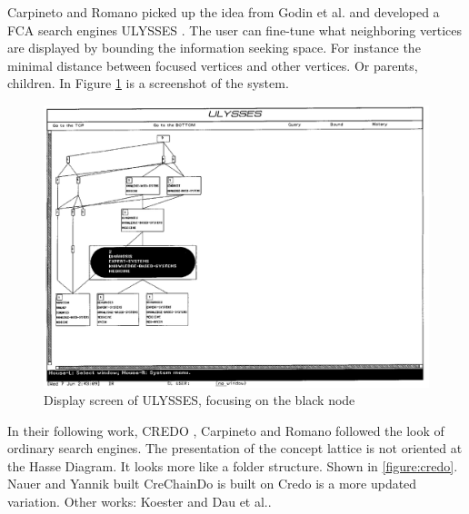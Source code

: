 \documentclass[11pt]{report}
\begin{document}
Carpineto and Romano picked up the idea from Godin et al. and developed a FCA search engines ULYSSES \cite{Carpineto1995,Carpineto1996}. The user can fine-tune what neighboring vertices are displayed by bounding the information seeking space. For instance the minimal distance between focused vertices and other vertices. Or parents, children. In Figure \ref{figure:ulysses} is a screenshot of the system. \\

\begin{figure}[h]
	\centering
	\includegraphics[width=\linewidth]{images/ulysses}
\caption{Display screen of ULYSSES, focusing on the black node \cite{Carpineto1996} }
\label{figure:ulysses}
\end{figure}

In their following work, CREDO \cite{Carpineto2004}, Carpineto and Romano followed the look of ordinary search engines. The presentation of the concept lattice is not oriented at the Hasse Diagram. It looks more like a folder structure. Shown in \ref{figure:credo}. Nauer and Yannik built CreChainDo \cite{Nauer2009} is built on Credo is a more updated variation. Other works: Koester \cite{Koester2006} and Dau et al.\cite{Dau2008}.\\
\end{document}
